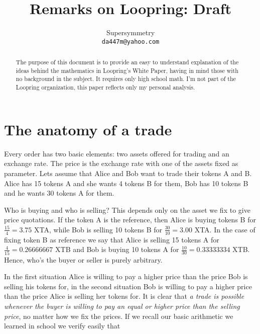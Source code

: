 \documentclass{article}
\theoremstyle{remark}
\theoremstyle{definition}
\begin{document}
\title{Remarks on Loopring: Draft}
\author{Supersymmetry\\
        \texttt{da447m@yahoo.com}}

\date{}
\maketitle

\begin{abstract}
The purpose of this document is to provide an easy to understand explanation of the ideas behind the mathematics in Loopring's White Paper, having in mind those with no background in the subject. It requires only high school math. I'm not part of the Loopring organization, this paper reflects only my personal analysis.
\end{abstract}


\section{The anatomy of a trade}\label{sect:sect1}

Every order has two basic elements: two assets offered for trading and an exchange rate. The price is the exchange rate with one of the assets fixed as parameter. Lets assume that Alice and Bob want to trade their tokens A and B. Alice has 15 tokens A and she wants 4 tokens B for them, Bob has 10 tokens B and he wants 30 tokens A for them.

Who is buying and who is selling? This depends only on the asset we fix to give price quotations. If the token A is the reference, then Alice is buying tokens B for $\frac{15}{4}=3.75$ XTA, while Bob is selling 10 tokens B for $\frac{30}{10}=3.00$ XTA. In the case of fixing token B as reference we say that Alice is selling 15 tokens A for $\frac{4}{15}=0.26666667$ XTB and Bob is buying 10 tokens A for $\frac{10}{30}=0.33333334$ XTB. Hence, who's the buyer or seller is purely arbitrary.

In the first situation Alice is willing to pay a higher price than the price Bob is selling his tokens for, in the second situation Bob is willing to pay a higher price than the price Alice is selling her tokens for. It is clear that \emph{a trade is possible whenever the buyer is willing to pay an equal or higher price than the selling price}, no matter how we fix the prices. If we recall our basic arithmetic we learned in school we verify easily that
\end{document}
